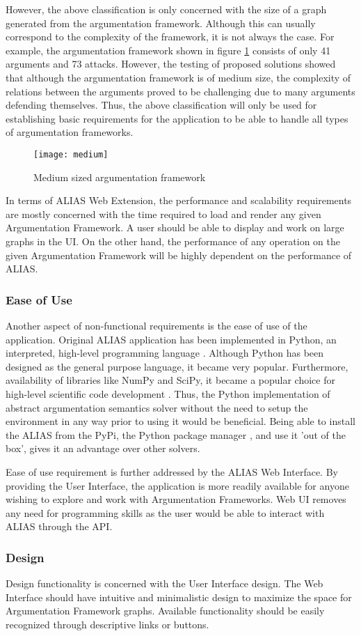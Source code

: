 However, the above classification is only concerned with the size of a graph generated from the argumentation framework. Although this can usually correspond to the complexity of the framework, it is not always the case. For example, the argumentation framework shown in figure \ref{fig:mediumAF} consists of only 41 arguments and 73 attacks. However, the testing of proposed solutions showed that although the argumentation framework is of medium size, the complexity of relations between the arguments proved to be challenging due to many arguments defending themselves. Thus, the above classification will only be used for establishing basic requirements for the application to be able to handle all types of argumentation frameworks. 

\begin{figure}[h]
	\texttt{[image: medium]}
	\caption{Medium sized argumentation framework}
	\label{fig:mediumAF}
\end{figure}

In terms of ALIAS Web Extension, the performance and scalability requirements are mostly concerned with the time required to load and render any given Argumentation Framework. A user should be able to display and work on large graphs in the UI. On the other hand, the performance of any operation on the given Argumentation Framework will be highly dependent on the performance of ALIAS.

\subsubsection{Ease of Use}

Another aspect of non-functional requirements is the ease of use of the application. Original ALIAS application has been implemented in Python, an interpreted, high-level programming language \citep{millman2011python}. Although Python has been designed as the general purpose language, it became very popular. Furthermore, availability of libraries like NumPy and SciPy, it became a popular choice for high-level scientific code development \citep{perez2011python}. Thus, the Python implementation of abstract argumentation semantics solver without the need to setup the environment in any way prior to using it would be beneficial. Being able to install the ALIAS from the PyPi, the Python package manager \citep{pypi}, and use it 'out of the box', gives it an advantage over other solvers.

Ease of use requirement is further addressed by the ALIAS Web Interface. By providing the User Interface, the application is more readily available for anyone wishing to explore and work with Argumentation Frameworks. Web UI removes any need for programming skills as the user would be able to interact with ALIAS through the API.

\subsubsection{Design} 
Design functionality is concerned with the User Interface design. The Web Interface should have intuitive and minimalistic design to maximize the space for Argumentation Framework graphs. Available functionality should be easily recognized through descriptive links or buttons.